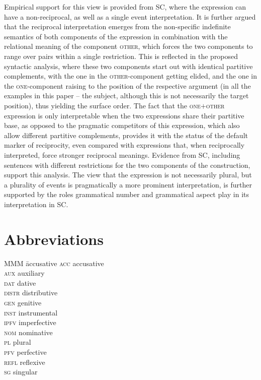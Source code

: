 \documentclass[output=paper,colorlinks,citecolor=brown]{langscibook}
\begin{document}
Empirical support for this view is provided from SC, where the expression can have a non-reciprocal, as well as a single event interpretation. It is further argued that the reciprocal interpretation emerges from the non-specific indefinite semantics of both components of the expression in combination with the relational meaning of the component \textsc{other}, which forces the two components to range over pairs within a single restriction. This is reflected in the proposed syntactic analysis, where these two components start out with identical partitive complements, with the one in the \textsc{other}-component getting elided, and the one in the \textsc{one}-component raising to the position of the respective argument (in all the examples in this paper -- the subject, although this is not necessarily the target position), thus yielding the surface order. The fact that the \textsc{one$+$other} expression is only interpretable when the two expressions share their partitive base, as opposed to the pragmatic competitors of this expression, which also allow different partitive complements, provides it with the status of the default marker of reciprocity, even compared with expressions that, when reciprocally interpreted, force stronger reciprocal meanings. Evidence from SC, including sentences with different restrictions for the two components 
of the construction, support this analysis. The view that the expression is not necessarily plural, but a plurality of events is pragmatically a more prominent interpretation, is further supported by the roles grammatical number and grammatical aspect play in its interpretation in SC.

\section*{Abbreviations}

\begin{multicols}{3}
\begin{tabbing}
MMM \= accusative\kill
\textsc{acc} \> accusative\\
\textsc{aux} \> auxiliary\\
\textsc{dat} \> dative\\
\textsc{distr} \> distributive\\
\textsc{gen} \> genitive\\
\textsc{inst} \> instrumental\\
\textsc{ipfv} \> imperfective\\
\textsc{nom} \> nominative\\
\textsc{pl} \> plural\\
\textsc{pfv} \> perfective\\
\textsc{refl} \> reflexive\\
\textsc{sg} \> singular
\end{tabbing}
\end{multicols}
\end{document}
